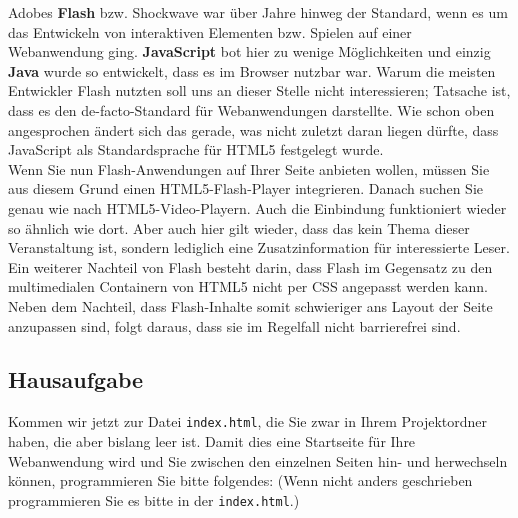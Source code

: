 Adobes \textbf{Flash} bzw. Shockwave war über Jahre hinweg der Standard, wenn es um das Entwickeln von interaktiven Elementen bzw. Spielen auf einer Webanwendung ging. \textbf{JavaScript} bot hier zu wenige Möglichkeiten und einzig \textbf{Java} wurde so entwickelt, dass es im Browser nutzbar war. Warum die meisten Entwickler Flash nutzten soll uns an dieser Stelle nicht interessieren; Tatsache ist, dass es den de-facto-Standard für Webanwendungen darstellte. Wie schon oben angesprochen ändert sich das gerade, was nicht zuletzt daran liegen dürfte, dass JavaScript als Standardsprache für HTML5 festgelegt wurde. \\

Wenn Sie nun Flash-Anwendungen auf Ihrer Seite anbieten wollen, müssen Sie aus diesem Grund einen HTML5-Flash-Player integrieren. Danach suchen Sie genau wie nach HTML5-Video-Playern. Auch die Einbindung funktioniert wieder so ähnlich wie dort. Aber auch hier gilt wieder, dass das kein Thema dieser Veranstaltung ist, sondern lediglich eine Zusatzinformation für interessierte Leser.\\

Ein weiterer Nachteil von Flash besteht darin, dass Flash im Gegensatz zu den multimedialen Containern von HTML5 nicht per CSS angepasst werden kann. Neben dem Nachteil, dass Flash-Inhalte somit schwieriger ans Layout der Seite anzupassen sind, folgt daraus, dass sie im Regelfall nicht barrierefrei sind.

\subsection{Hausaufgabe}

Kommen wir jetzt zur Datei \verb|index.html|, die Sie zwar in Ihrem Projektordner haben, die aber bislang leer ist. Damit dies eine Startseite für Ihre Webanwendung wird und Sie zwischen den einzelnen Seiten hin- und herwechseln können, programmieren Sie bitte folgendes: (Wenn nicht anders geschrieben programmieren Sie es bitte in der \verb|index.html|.)

